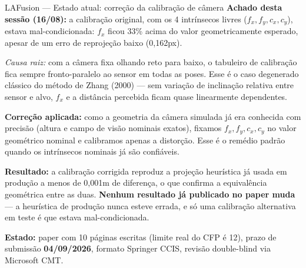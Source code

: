 \documentclass[aspectratio=169]{beamer}
\begin{document}
\begin{frame}{LAFusion — Estado atual: correção da calibração de câmera}
\small
\textbf{Achado desta sessão (16/08):} a calibração original, com os 4 intrínsecos livres ($f_x,f_y,c_x,c_y$), estava mal-condicionada: $f_x$ ficou 33\% acima do valor geometricamente esperado, apesar de um erro de reprojeção baixo (0,162px).

\vspace{0.15cm}
\scriptsize \emph{Causa raiz:} com a câmera fixa olhando reto para baixo, o tabuleiro de calibração fica sempre fronto-paralelo ao sensor em todas as poses. Esse é o caso degenerado clássico do método de Zhang (2000) — sem variação de inclinação relativa entre sensor e alvo, $f_x$ e a distância percebida ficam quase linearmente dependentes.

\vspace{0.2cm}
\small\textbf{Correção aplicada:} como a geometria da câmera simulada já era conhecida com precisão (altura e campo de visão nominais exatos), fixamos $f_x,f_y,c_x,c_y$ no valor geométrico nominal e calibramos apenas a distorção. Esse é o remédio padrão quando os intrínsecos nominais já são confiáveis.

\vspace{0.2cm}
\textbf{Resultado:} a calibração corrigida reproduz a projeção heurística já usada em produção a menos de 0,001m de diferença, o que confirma a equivalência geométrica entre as duas. \textbf{Nenhum resultado já publicado no paper muda} — a heurística de produção nunca esteve errada, e só uma calibração alternativa em teste é que estava mal-condicionada.

\vspace{0.2cm}
\textbf{Estado:} paper com 10 páginas escritas (limite real do CFP é 12), prazo de submissão \textbf{04/09/2026}, formato Springer CCIS, revisão double-blind via Microsoft CMT.
\end{frame}
\end{document}
